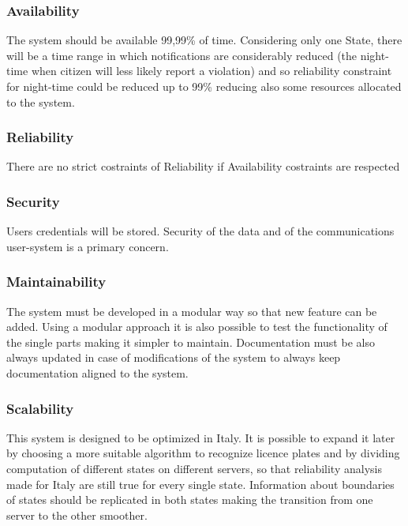 \subsubsection{Availability}
The system should be available 99,99\% of time. Considering only one State, there will be a time range 
in which notifications are considerably reduced (the night-time when citizen will less likely report 
a violation) and so reliability constraint for night-time could be reduced up to 99\% reducing also some 
resources allocated to the system.
\subsubsection{Reliability}
There are no strict costraints of Reliability if Availability costraints are respected
\subsubsection{Security}

Users credentials will be stored. Security of the data and of the communications user-system is a primary concern.

\subsubsection {Maintainability}
The system must be developed in a modular way so that new feature can be added.
Using a modular approach it is also possible to test the functionality of the single parts making it simpler to maintain.
Documentation must be also always updated in case of modifications of the system to always keep documentation aligned to the system.
\subsubsection{Scalability}
This system is designed to be optimized in Italy. It is possible to expand it later by choosing a more suitable
algorithm to recognize licence plates and by dividing computation of different states on different servers, so that reliability analysis made for Italy are still true for every single state. Information about boundaries
of states should be replicated in both states making the transition from one server to the other smoother.
